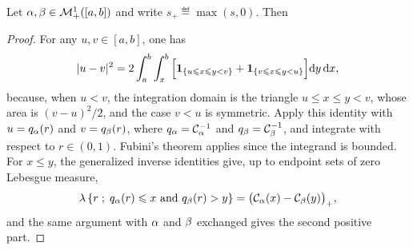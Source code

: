 \begin{prop}\label{prop-bobkov-ledoux-cdf-w2}
	Let $\alpha,\beta\in\mathcal{M}_+^1([a,b])$ and write $s_+\eqdef\max(s,0)$. Then
\end{prop}
\begin{proof}
	For any $u,v\in[a,b]$, one has
	\[
		|u-v|^2
		=
		2\int_a^b\int_x^b
		\Big[
		\mathbf 1_{\{u\leqslant x\leqslant y<v\}}
		+
		\mathbf 1_{\{v\leqslant x\leqslant y<u\}}
		\Big]\mathrm{d} y\,\mathrm{d} x,
	\]
	because, when $u<v$, the integration domain is the triangle $u\leq x\leq y<v$, whose area is $(v-u)^2/2$, and the case $v<u$ is symmetric. Apply this identity with $u=q_\alpha(r)$ and $v=q_\beta(r)$, where $q_\alpha=\mathcal{C}_{\alpha}^{-1}$ and $q_\beta=\mathcal{C}_{\beta}^{-1}$, and integrate with respect to $r\in(0,1)$. Fubini's theorem applies since the integrand is bounded. For $x\leq y$, the generalized inverse identities give, up to endpoint sets of zero Lebesgue measure,
	\[
		\lambda\enscond{r}{q_\al(r)\leq x\ \text{and}\ q_\be(r)>y}
		=
		\big(\cumul{\al}(x)-\cumul{\be}(y)\big)_+,
	\]
	and the same argument with $\alpha$ and $\beta$ exchanged gives the second positive part.
\end{proof}


